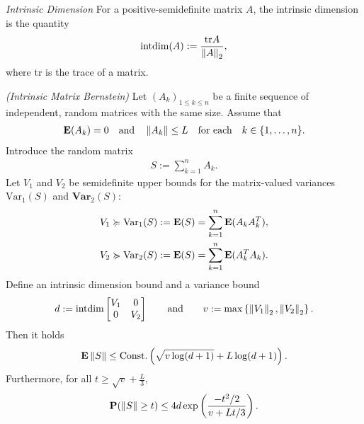 \begin{definition}
  \emph{Intrinsic Dimension}
  \label{rmineq_intrinsic_bernstein}
  For a positive-semidefinite matrix $A$,
  the intrinsic dimension is the quantity
  \begin{gather*}
    \text{intdim}
    (A)
    :=
    \frac{\text{tr}A}{\left\lVert A\right\rVert_2}
    ,
  \end{gather*}
  where tr is the trace of a matrix.
\end{definition}
\begin{theorem}
  \emph{(Intrinsic Matrix Bernstein)}
  \label{rmineq_bernstein}
  Let $(A_k)_{1\le k \le n}$  be a finite sequence of independent, random matrices with the same size. Assume that
    \begin{gather}
      \mathbf{E}(A_k)=0\quad\text{and}\quad\left\lVert A_k\right\rVert\le L \quad \text{for each}\quad  k\in \{1,\ldots,n\}.
    \end{gather}
  Introduce the random matrix
      \begin{gather*}
        S:=\sum_{k=1}^n A_k.
      \end{gather*}
  Let 
  $V_1$ 
  and
  $V_2$ 
  be semidefinite upper bounds for the matrix-valued variances
  $\mathrm{Var}_1(S)$
  and
  $\textbf{Var}_2(S)$:
  \begin{align*}
    V_1 
    &\succcurlyeq 
    \text{Var}_1(S)
    :=
    \mathbf{E}(S)
    =
    \sum_{k = 1}^{n}
    \mathbf{E}(A_k A_k^T),\\
    V_2 
    &\succcurlyeq 
    \text{Var}_2(S)
    :=
    \mathbf{E}(S)
    =
    \sum_{k = 1}^{n}
    \mathbf{E}(A_k^T A_k)
    .
  \end{align*}
  Define an intrinsic dimension bound and a variance bound
  \begin{gather}
    \label{ rmineq_intrinsic_bernstein_intdim_var_bound }
    d
    :=
    \text{intdim}
    \begin{bmatrix}
      V_1 & 0 \\
      0   & V_2
    \end{bmatrix}
    \qquad
    \text{and}
    \qquad
    v
    :=
    \max
    \left\{ \left\lVert V_1\right\rVert_2, \left\lVert V_2\right\rVert_2 \right\}
    .
  \end{gather}
  Then 
  it holds
      \begin{align}
        \label{rmineq_intrinsic_bernstein_expectation_bound}
        \mathbf{E}\left\lVert S\right\rVert\le \text{Const.}\left( \sqrt{v\log(d+1)} + L\log(d+1) \right).
      \end{align}
    Furthermore, for all 
  $
    t
    \ge
    \sqrt{v}
    +
    \frac{L}{3}
  $,
      \begin{gather}
        \label{rmineq_intrinsic_bernstein_probability_bound}
        \mathbf{P}(\left\lVert S\right\rVert\ge t)\le 4d \exp\left(\frac{-t^2/2}{v+Lt/3} \right).
      \end{gather}
\end{theorem}

